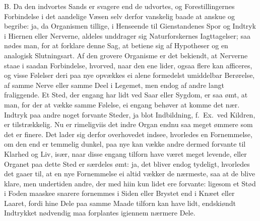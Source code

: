 \documentclass[12pt,a4paper]{article}
\newcommand{\opage}[1]{\marginnote{\footnotesize\textit{[#1]}}}
\begin{document}
\opage{94} B. Da den indvortes Sands er svagere end de udvortes, og Forestillingernes Forbindelse i
det aandelige Væsen selv derfor vanskelig baade at anskue og begribe: ja, da Organismen
tillige, i Henseende til Gienstandenes Spor og Indtryk i Hiernen eller Nerverne, aldeles
unddrager sig Naturforskernes Iagttagelser; saa nødes man, for at forklare denne Sag, at
betiene sig af Hypotheser og en analogisk Slutningsart. Af den grovere Organisme er det
bekiendt, at Nerverne staae i saadan Forbindelse, hvorved, naar den ene lider, ogsaa
flere kan afficeres, og visse Følelser deri paa nye opvækkes ei alene formedelst
umiddelbar Berørelse, af samme Nerve eller samme Deel i Legemet, men endog af andre langt
fraliggende. Et Sted, der engang har lidt ved Saar eller Sygdom, er saa ømt, at man, for
der at vække samme Følelse, ei engang behøver at komme det nær. Indtryk paa andre noget
forvante Steder, ja blot Indbildning, f.~Ex.\ ved Kildren, er tilstrækkelig. Nu er
rimeligviis det indre Organ endnu saa meget ømmere som det er finere. Det lader sig derfor
overhovedet indsee, hvorledes en Fornemmelse, om den end er temmelig dunkel, paa nye kan
vække andre dermed forvante til Klarhed og Liv, især, naar disse engang tilforn have
været meget levende, eller Organet paa dette Sted er særdeles ømt: ja, det bliver endog
tydeligt, hvorledes det gaaer til, at en nye Fornemmelse ei altid vækker de nærmeste, saa
at de blive klare, men undertiden
\opage{95} andre, der med hiin kun lidet ere forvante: ligesom et Stød i Foden maaskee snarere
fornemmes i Siden eller Brystet end i Knæet eller Laaret, fordi hine Dele paa samme Maade
tilforn kan have lidt, endskiøndt Indtrykket nødvendig maa forplantes igiennem nærmere
Dele.
\end{document}
